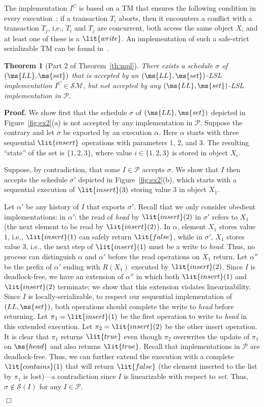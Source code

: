 \documentclass[11pt,pdftex,letterpaper]{article}
\newtheorem{theorem}{Theorem}
\newenvironment{proof}[1][Proof]{\noindent\textbf{#1.} }{\hfill $\Box$\\[2mm]}
\def\S{\ensuremath{\mathcal{S}}}
\newcommand{\true}{\lit{true}}
\newcommand{\false}{\lit{false}}
\newcommand{\LL}{\ms{LL}}
\begin{document}
The implementation $I^C$ is
based on a TM that ensures the following condition in every execution~\cite{GK09-progressiveness}: 
if a transaction $T_i$ aborts, then it encounters a conflict with a transaction $T_j$, i.e.,  
$T_i$ and $T_j$ are concurrent, both access the same object $X$, and
at least one of these is a $\lit{write}$.
An implementation of such a safe-strict serializable TM can be
found in~\cite{KR11}. 
\begin{theorem}[Part 2 of Theorem~\ref{th:mpl}]
There exists a schedule $\sigma$ of $(\LL,\ms{set})$ 
that is accepted by an $(\LL ,\ms{set})$-LSL  implementation $I^C \in \mathcal{SM}$,
but not accepted by \emph{any} $(\LL ,\ms{set})$-LSL implementation in $\mathcal{P}$.
\end{theorem}
\begin{proof}
We show first that the schedule $\sigma$ of $(\LL,\ms{set})$ depicted
in Figure~\ref{fig:ex2}(a) is not accepted by any implementation in $\mathcal{P}$.
Suppose the contrary and let $\sigma$ be exported by an execution $\alpha$. 
Here $\alpha$ starts with three sequential $\lit{insert}$ operations with
parameters $1$, $2$, and $3$. The resulting ``state'' of the set is
$\{1,2,3\}$, where value $i\in \{1,2,3\}$ is stored in object $X_i$.   

Suppose, by contradiction, that some $I\in \mathcal{P}$ accepts $\sigma$. 
We show that $I$ then accepts the schedule $\sigma'$ depicted in Figure~\ref{fig:ex2}(b), which starts with a sequential
execution of $\lit{insert}(3)$ storing value $3$ in object $X_1$. 

Let $\alpha'$ be any history of $I$ that exports $\sigma'$.
Recall that we only consider obedient implementations:
in $\alpha'$: the read of \emph{head} by $\lit{insert}(2)$ in $\sigma'$ refers to $X_1$ (the next element to be read by $\lit{insert}(2)$). 
In $\alpha$, element $X_1$ stores value $1$,
i.e., $\lit{insert}(1)$ can safely return $\lit{false}$, while in
$\sigma'$, $X_1$ stores value $3$, i.e., the next step of
$\lit{insert}(1)$ must be a write to \emph{head}.       
Thus, no process
can distinguish $\alpha$ and $\alpha'$ 
before the
read operations on $X_1$ return. 
Let $\alpha''$ be the prefix of $\alpha'$ ending with $R(X_1)$
executed by $\lit{insert}(2)$.
Since $I$ is deadlock-free, we have an extension of $\alpha''$ in
which both $\lit{insert}(1)$ and $\lit{insert}(2)$ terminate; we show that this extension violates linearizability. 
Since $I$ is locally-serializable, to respect our sequential implementation
of $(LL,\ms{set})$, both operations should complete the write to \emph{head}
before returning. 
Let $\pi_1=\lit{insert}(1)$ be the first operation to write to
\emph{head} in this extended execution. 
Let $\pi_2=\lit{insert}(2)$ be the other insert operation.
It is clear that $\pi_1$ returns $\true$ even though $\pi_2$ overwrites the update of $\pi_1$ on $\ms{head}$
and also returns $\true$. 
Recall that implementations in $\mathcal{P}$ are deadlock-free. 
Thus,   
we can further extend the execution with a complete $\lit{contains}(1)$
that will return $\false$ (the element inserted to the list by $\pi_1$
is lost)---a contradiction since $I$ is linearizable with respect to \emph{set}. 
Thus, $\sigma\notin\S(I)$ for any $I\in \mathcal{P}$.


\end{proof}
\end{document}
